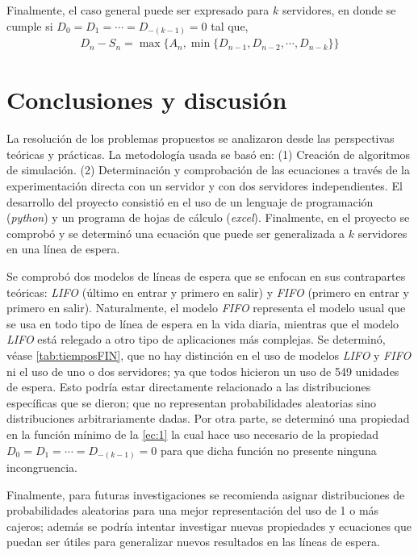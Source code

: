 \documentclass[journal]{IEEEtran}
\begin{document}
Finalmente, el caso general puede ser expresado para $k$ servidores, en donde se cumple si $D_0=D_1=\cdots= D_{-(k-1)}=0$ tal que, 
 \begin{align}
 	D_n-S_n=\max\{A_n,\min\{D_{n-1},D_{n-2},\cdots, D_{n-k}\}\} \label{ec:1}
 \end{align}

\section{Conclusiones y discusión}

La resolución de los problemas propuestos se analizaron desde las perspectivas teóricas y prácticas. La metodología usada se basó en: (1) Creación de algoritmos de simulación. (2) Determinación y comprobación de las ecuaciones a través de la experimentación directa con un servidor y con dos servidores independientes. El desarrollo del proyecto consistió en el uso de un lenguaje de programación (\textit{python}) y un programa de hojas de cálculo (\textit{excel}). Finalmente, en el proyecto se comprobó y se determinó una ecuación que puede ser generalizada a $k$ servidores en una línea de espera. 
\bigbreak

Se comprobó dos modelos de líneas de espera que se enfocan en sus contrapartes teóricas: \textit{LIFO} (último en entrar y primero en salir) y \textit{FIFO} (primero en entrar y primero en salir). Naturalmente, el modelo \textit{FIFO} \cite{ross2013simulation} representa el modelo usual que se usa en todo tipo de línea de espera en la vida diaria, mientras que el modelo \textit{LIFO} está relegado a otro tipo de aplicaciones más complejas. Se determinó, véase \cref{tab:tiemposFIN}, que no hay distinción en el uso de modelos \textit{LIFO} y \textit{FIFO} ni el uso de uno o dos servidores; ya que todos hicieron un uso de 549 unidades de espera. Esto podría estar directamente relacionado a las distribuciones específicas que se dieron; que no representan probabilidades aleatorias sino distribuciones arbitrariamente dadas. Por otra parte, se determinó una propiedad en la función mínimo de la \cref{ec:1} la cual hace uso necesario de la propiedad $D_0=D_1=\cdots= D_{-(k-1)}=0$ para que dicha función no presente ninguna incongruencia. 

Finalmente, para futuras investigaciones se recomienda asignar distribuciones de probabilidades aleatorias para una mejor representación del uso de 1 o más cajeros; además se podría intentar investigar nuevas propiedades y ecuaciones que puedan ser útiles para generalizar nuevos resultados en las líneas de espera. 
\end{document}
